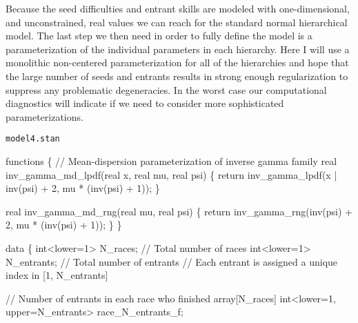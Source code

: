 \documentclass[
  letterpaper,
  DIV=11,
  numbers=noendperiod]{scrartcl}
\newenvironment{Shaded}{\begin{snugshade}}{\end{snugshade}}
\newcommand{\CommentTok}[1]{\textcolor[rgb]{0.37,0.37,0.37}{#1}}
\newcommand{\ControlFlowTok}[1]{\textcolor[rgb]{0.00,0.23,0.31}{#1}}
\newcommand{\DataTypeTok}[1]{\textcolor[rgb]{0.68,0.00,0.00}{#1}}
\newcommand{\DecValTok}[1]{\textcolor[rgb]{0.68,0.00,0.00}{#1}}
\newcommand{\KeywordTok}[1]{\textcolor[rgb]{0.00,0.23,0.31}{#1}}
\newcommand{\NormalTok}[1]{\textcolor[rgb]{0.00,0.23,0.31}{#1}}
\begin{document}
Because the seed difficulties and entrant skills are modeled with
one-dimensional, and unconstrained, real values we can reach for the
standard normal hierarchical model. The last step we then need in order
to fully define the model is a parameterization of the individual
parameters in each hierarchy. Here I will use a monolithic non-centered
parameterization for all of the hierarchies and hope that the large
number of seeds and entrants results in strong enough regularization to
suppress any problematic degeneracies. In the worst case our
computational diagnostics will indicate if we need to consider more
sophisticated parameterizations.

\begin{codelisting}

\caption{\texttt{model4.stan}}

\begin{Shaded}
\begin{Highlighting}[]
\KeywordTok{functions}\NormalTok{ \{}
  \CommentTok{// Mean{-}dispersion parameterization of inverse gamma family}
  \DataTypeTok{real}\NormalTok{ inv\_gamma\_md\_lpdf(}\DataTypeTok{real}\NormalTok{ x, }\DataTypeTok{real}\NormalTok{ mu, }\DataTypeTok{real}\NormalTok{ psi) \{}
    \ControlFlowTok{return}\NormalTok{ inv\_gamma\_lpdf(x | inv(psi) + }\DecValTok{2}\NormalTok{, mu * (inv(psi) + }\DecValTok{1}\NormalTok{));}
\NormalTok{  \}}

  \DataTypeTok{real}\NormalTok{ inv\_gamma\_md\_rng(}\DataTypeTok{real}\NormalTok{ mu, }\DataTypeTok{real}\NormalTok{ psi) \{}
    \ControlFlowTok{return}\NormalTok{ inv\_gamma\_rng(inv(psi) + }\DecValTok{2}\NormalTok{, mu * (inv(psi) + }\DecValTok{1}\NormalTok{));}
\NormalTok{  \}}
\NormalTok{\}}

\KeywordTok{data}\NormalTok{ \{}
  \DataTypeTok{int}\NormalTok{\textless{}}\KeywordTok{lower}\NormalTok{=}\DecValTok{1}\NormalTok{\textgreater{} N\_races;    }\CommentTok{// Total number of races}
  \DataTypeTok{int}\NormalTok{\textless{}}\KeywordTok{lower}\NormalTok{=}\DecValTok{1}\NormalTok{\textgreater{} N\_entrants; }\CommentTok{// Total number of entrants}
  \CommentTok{// Each entrant is assigned a unique index in [1, N\_entrants]}

  \CommentTok{// Number of entrants in each race who finished}
  \DataTypeTok{array}\NormalTok{[N\_races] }\DataTypeTok{int}\NormalTok{\textless{}}\KeywordTok{lower}\NormalTok{=}\DecValTok{1}\NormalTok{, }\KeywordTok{upper}\NormalTok{=N\_entrants\textgreater{} race\_N\_entrants\_f;}


\end{Highlighting}
\end{Shaded}
\end{codelisting}
\end{document}

